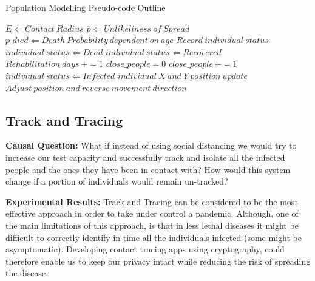 \begin{algorithm}
\caption{Population Modelling Pseudo-code Outline}
\label{alg1}
\begin{algorithmic}[1]
  \STATE $E \Leftarrow Contact\:Radius$
  \STATE $\overline{p} \Leftarrow Unlikeliness\:of\:Spread$
  \STATE $p\_died \Leftarrow Death\:Probability\:dependent\:on\:age$
      \STATE$Record\:individual\:status$
        \STATE $individual\:status \Leftarrow Dead$
      \ELSE
          \STATE $individual\:status \Leftarrow Recovered$
        \ENDIF
        \STATE $Rehabilitation\:days\:+= 1$
      \ENDIF
        \STATE $close\_people = 0$
        \STATE $close\_people\:+= 1$
        \ENDIF
        \ENDFOR
          \STATE $individual\:status \Leftarrow Infected$
        \ENDIF
      \ENDIF
          \STATE $individual\:X\:and\:Y\:position\:update$
            \STATE $Adjust\:position\:and\:reverse\:movement\:direction$
          \ENDIF
      \ENDIF
  \ENDFOR
\ENDFOR
\end{algorithmic}
\end{algorithm}

\subsection{Track and Tracing}

\textbf{Causal Question:} What if instead of using social distancing we would try to increase our test capacity and successfully track and isolate all the infected people and the ones they have been in contact with? How would this system change if a portion of individuals would remain un-tracked?

\textbf{Experimental Results:} Track and Tracing can be considered to be the most effective approach in order to take under control a pandemic. Although, one of the main limitations of this approach, is that in less lethal diseases it might be difficult to correctly identify in time all the individuals infected (some might be asymptomatic). Developing contact tracing apps using cryptography, could therefore enable us to keep our privacy intact while reducing the risk of spreading the disease.

